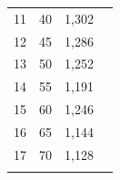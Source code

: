 \documentclass[14pt,a4paper]{article}
\begin{document}
\begin{table}[!htb]
\begin{center}
\begin{tabular}{clll}
                     11		& \hspace*{20 ex}40			& \hspace*{15 ex}1,302		\\
                     12		& \hspace*{20 ex}45			& \hspace*{15 ex}1,286		\\
                     13		& \hspace*{20 ex}50			& \hspace*{15 ex}1,252		\\
                     14		& \hspace*{20 ex}55			& \hspace*{15 ex}1,191		\\
                     15		& \hspace*{20 ex}60			& \hspace*{15 ex}1,246		\\
                     16		& \hspace*{20 ex}65			& \hspace*{15 ex}1,144		\\
                     17		& \hspace*{20 ex}70	  		& \hspace*{15 ex}1,128		\\
                     \hline
                     \label{fig:table3}
                 \end{tabular}
                 \label{tab:tab3} 
             \end{center}
         \end{table}
         

            

         \printbibliography
\end{document}
